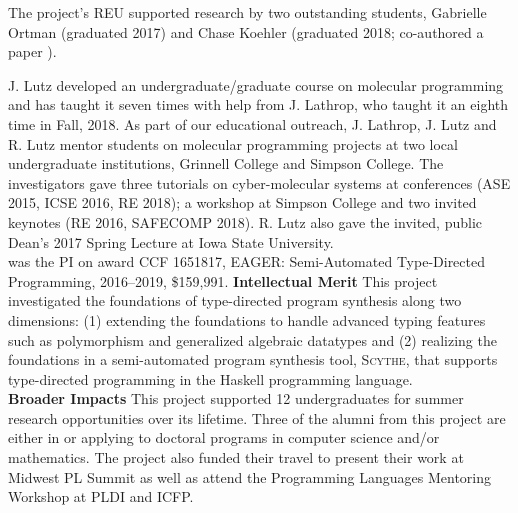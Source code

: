The project's REU supported research by two outstanding students, Gabrielle Ortman (graduated 2017)  and Chase Koehler (graduated 2018; co-authored a paper \cite{cKMHL18}).

J. Lutz developed  an undergraduate/graduate course on molecular programming and has taught it seven times with help from J. Lathrop, who taught it an eighth time in Fall, 2018.  As part of our educational outreach, J. Lathrop, J. Lutz and R. Lutz mentor students on molecular programming projects at two local undergraduate institutions, Grinnell College and Simpson College.
The investigators gave three tutorials on cyber-molecular systems at conferences (ASE 2015, ICSE 2016, RE 2018); a workshop at Simpson College and two invited keynotes (RE 2016, SAFECOMP 2018).
R. Lutz also gave the invited, public Dean's 2017 Spring Lecture at Iowa State University. \\

 was the PI on award CCF 1651817, EAGER: Semi-Automated Type-Directed Programming, 2016--2019, \$159,991.
{\bf Intellectual Merit}
This project investigated the foundations of type-directed program synthesis along two dimensions: (1) extending the foundations to handle advanced typing features such as polymorphism and generalized algebraic datatypes and (2) realizing the foundations in a semi-automated program synthesis tool, \textsc{Scythe}, that supports type-directed programming in the Haskell programming language. \\
{\bf Broader Impacts}
This project supported 12 undergraduates for summer research opportunities over its lifetime.
Three of the alumni from this project are either in or applying to doctoral programs in computer science and/or mathematics.
The project also funded their travel to present their work at Midwest PL Summit as well as attend the Programming Languages Mentoring Workshop at PLDI and ICFP.
